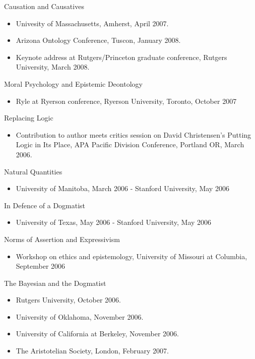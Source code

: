 \documentclass[
  10pt,
  letterpaper,
  DIV=11,
  numbers=noendperiod,
  twoside]{scrartcl}
\providecommand{\tightlist}{%
  \setlength{\itemsep}{0pt}\setlength{\parskip}{0pt}}\usepackage{longtable,booktabs,array}
\begin{document}
Causation and Causatives

\begin{itemize}
\tightlist
\item
  Univesity of Massachusetts, Amherst, April 2007.
\item
  Arizona Ontology Conference, Tuscon, January 2008.
\item
  Keynote address at Rutgers/Princeton graduate conference, Rutgers
  University, March 2008.
\end{itemize}

Moral Psychology and Epistemic Deontology

\begin{itemize}
\tightlist
\item
  Ryle at Ryerson conference, Ryerson University, Toronto, October 2007
\end{itemize}

Replacing Logic

\begin{itemize}
\tightlist
\item
  Contribution to author meets critics session on David Christensen's
  Putting Logic in Its Place, APA Pacific Division Conference, Portland
  OR, March 2006.
\end{itemize}

Natural Quantities

\begin{itemize}
\tightlist
\item
  University of Manitoba, March 2006 - Stanford University, May 2006
\end{itemize}

In Defence of a Dogmatist

\begin{itemize}
\tightlist
\item
  University of Texas, May 2006 - Stanford University, May 2006
\end{itemize}

Norms of Assertion and Expressivism

\begin{itemize}
\tightlist
\item
  Workshop on ethics and epistemology, University of Missouri at
  Columbia, September 2006
\end{itemize}

The Bayesian and the Dogmatist

\begin{itemize}
\tightlist
\item
  Rutgers University, October 2006.
\item
  University of Oklahoma, November 2006.
\item
  University of California at Berkeley, November 2006.
\item
  The Aristotelian Society, London, February 2007.
\end{itemize}
\end{document}

